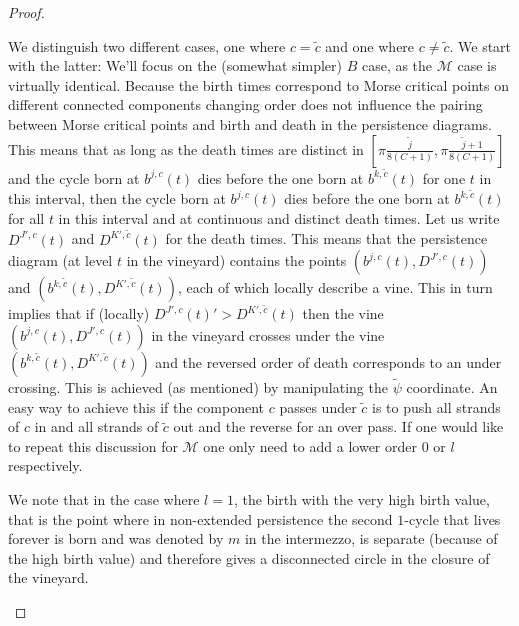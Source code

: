 \documentclass[twoside,leqno]{article}
\newcommand{\M}{\mathcal{M}}
\begin{document}
\begin{proof}
\begin{itemize}
We distinguish two different cases, one where $c = \tilde{c}$ and one where $c \neq \tilde{c}$. We start with the latter: We'll focus on the (somewhat simpler) $B$ case, as the $\M$ case is virtually identical. Because the birth times correspond to Morse critical points on different connected components changing order does not influence the pairing between Morse critical points and birth and death in the persistence diagrams. This means that as long as the death times are distinct in  $[ \pi \frac{\tilde{j}}{8 (C+1)} , \pi \frac{\tilde{j}+1}{8 (C+1)}  ]$ and the cycle born at $b^{j,c}(t)$ dies before the one born at $b^{k,\tilde{c}}(t)$ for one $t$ in this interval, then the cycle born at $b^{j,c}(t)$ dies before the one born at $b^{k,\tilde{c}}(t)$ for all $t$ in this interval and at continuous and distinct death times. Let us write $D^{J',c} (t)$ and $D^{K',\tilde{c}}(t)$ for the death times.  
This means that the persistence diagram (at level $t$ in the vineyard) contains the points $(b^{j,c}(t) ,D^{J',c} (t))$ and $(b^{k,\tilde{c}}(t) ,D^{K',\tilde{c}}(t))$, each of which locally describe a vine. This in turn implies that if (locally) $D^{J',c} (t)'> D^{K',\tilde{c}}(t)$  then the vine $( b^{j,c}(t) ,D^{J',c} (t))$ in the vineyard crosses under the vine $(b^{k,\tilde{c}}(t) ,D^{K',\tilde{c}}(t))$ and the reversed order of death corresponds to an under crossing. This is achieved (as mentioned) by manipulating the $\tilde{\psi}$ coordinate. An easy way to achieve this if the component $c$ passes under $\tilde{c}$ is to push all strands of $c$ in and all strands of $\tilde{c}$ out and the reverse for an over pass.  If one would like to repeat this discussion for $\M$ one only need to add a lower order $0$ or $l$ respectively. 

 We note that in the case where $l=1$, the birth with the very high birth value, that is the point where in non-extended persistence the second $1$-cycle that lives forever is born and was denoted by $m$ in the intermezzo, is separate (because of the high birth value) and therefore gives a disconnected circle in the closure of the vineyard.  


\end{itemize}
\end{proof}
\end{document}
